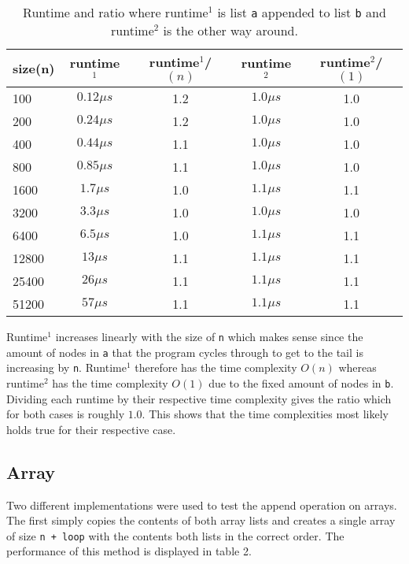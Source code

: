 \documentclass[a4paper,11pt]{article}
\begin{document}
\begin{table}[h]
  \begin{center}
  \begin{tabular}{l|c|c|c|c}
  \textbf{size(n)} & \textbf{runtime$^1$} & \textbf{runtime$^1$/$(n)$} 
  & \textbf{runtime$^2$} & \textbf{runtime$^2$/$(1)$}\\
  \hline
    100     & $ 0.12 \mu s$ &   1.2   & $ 1.0 \mu s$ &    1.0\\
    200     & $ 0.24 \mu s$ &   1.2   & $ 1.0 \mu s$ &    1.0\\
    400     & $ 0.44 \mu s$ &   1.1   & $ 1.0 \mu s$ &    1.0\\
    800     & $ 0.85 \mu s$ &   1.1   & $ 1.0 \mu s$ &    1.0\\
    1600    & $ 1.7 \mu s$  &   1.0   & $ 1.1 \mu s$ &    1.1\\
    3200    & $ 3.3 \mu s$  &   1.0   & $ 1.0 \mu s$ &    1.0\\
    6400    & $ 6.5 \mu s$  &   1.0   & $ 1.1 \mu s$ &    1.1\\
    12800   & $ 13 \mu s$   &   1.1   & $ 1.1 \mu s$ &    1.1\\
    25400   & $ 26 \mu s$   &   1.1   & $ 1.1 \mu s$ &    1.1\\
    51200   & $ 57 \mu s$   &   1.1   & $ 1.1 \mu s$ &    1.1\\ 
  \end{tabular}
  \caption{Runtime and ratio where runtime$^1$ is list {\tt a} appended
          to list {\tt b} and runtime$^2$ is the other way around.}
  \label{tab:table1}
  \end{center}
\end{table}

Runtime$^1$ increases linearly with the size of {\tt n} which makes
sense since the amount of nodes in {\tt a} that the program cycles 
through to get to the tail is increasing by {\tt n}. Runtime$^1$ 
therefore has the time complexity $ O(n)$ whereas runtime$^2$ has the 
time complexity $ O(1)$ due to the fixed amount of nodes in {\tt b}.
Dividing each runtime by their respective time complexity gives the
ratio which for both cases is roughly $ 1.0$. This shows that the time 
complexities most likely holds true for their respective case.

\subsection*{Array}

Two different implementations were used to test the append operation
on arrays. The first simply copies the contents of both array lists and
creates a single array of size {\tt n + loop} with the contents both
lists in the correct order. The performance of this method is displayed
in table 2.
\end{document}
